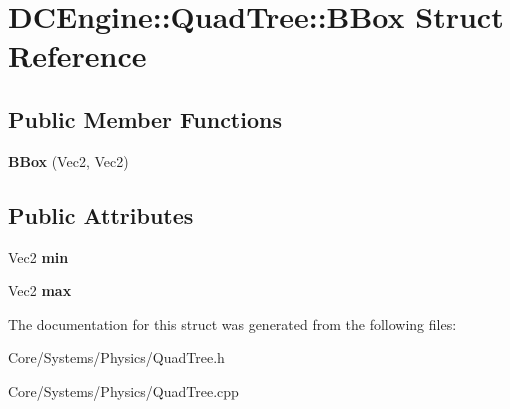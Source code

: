 \hypertarget{structDCEngine_1_1QuadTree_1_1BBox}{\section{D\-C\-Engine\-:\-:Quad\-Tree\-:\-:B\-Box Struct Reference}
\label{structDCEngine_1_1QuadTree_1_1BBox}
}
\subsection*{Public Member Functions}
\begin{DoxyCompactItemize}
\item 
\hypertarget{structDCEngine_1_1QuadTree_1_1BBox_a14fd629b679b863074b4e3eb19b135ef}{{\bfseries B\-Box} (Vec2, Vec2)}\label{structDCEngine_1_1QuadTree_1_1BBox_a14fd629b679b863074b4e3eb19b135ef}

\end{DoxyCompactItemize}
\subsection*{Public Attributes}
\begin{DoxyCompactItemize}
\item 
\hypertarget{structDCEngine_1_1QuadTree_1_1BBox_a120ef0ae253d2f7a8a8f3ab40af9c17a}{Vec2 {\bfseries min}}\label{structDCEngine_1_1QuadTree_1_1BBox_a120ef0ae253d2f7a8a8f3ab40af9c17a}

\item 
\hypertarget{structDCEngine_1_1QuadTree_1_1BBox_ae7061e58e31c7b3b775d10c6c016c990}{Vec2 {\bfseries max}}\label{structDCEngine_1_1QuadTree_1_1BBox_ae7061e58e31c7b3b775d10c6c016c990}

\end{DoxyCompactItemize}


The documentation for this struct was generated from the following files\-:\begin{DoxyCompactItemize}
\item 
Core/\-Systems/\-Physics/Quad\-Tree.\-h\item 
Core/\-Systems/\-Physics/Quad\-Tree.\-cpp\end{DoxyCompactItemize}
